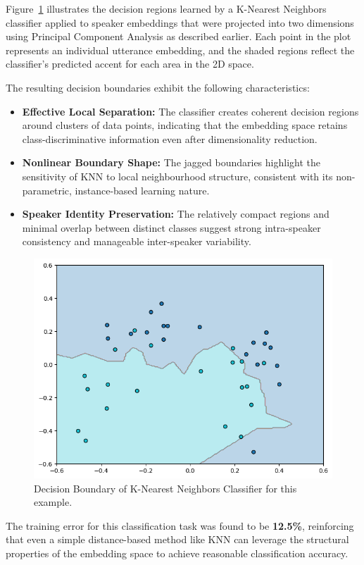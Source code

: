 \documentclass[conference]{IEEEtran}
\begin{document}
	
	Figure~\ref{fig:knn-shl-ilo} illustrates the decision regions learned by a K-Nearest Neighbors classifier applied to speaker embeddings that were projected into two dimensions using Principal Component Analysis as described earlier. Each point in the plot represents an individual utterance embedding, and the shaded regions reflect the classifier's predicted accent for each area in the 2D space.
	
	The resulting decision boundaries exhibit the following characteristics:
	
	\begin{itemize}
		\item \textbf{Effective Local Separation:} The classifier creates coherent decision regions around clusters of data points, indicating that the embedding space retains class-discriminative information even after dimensionality reduction.
		\item \textbf{Nonlinear Boundary Shape:} The jagged boundaries highlight the sensitivity of KNN to local neighbourhood structure, consistent with its non-parametric, instance-based learning nature.
		\item \textbf{Speaker Identity Preservation:} The relatively compact regions and minimal overlap between distinct classes suggest strong intra-speaker consistency and manageable inter-speaker variability.
	\end{itemize}
	
	
	\begin{figure}[H]
		\centering
		\includegraphics[width=0.7\linewidth]{img/img-knn-shl-ilo.png}
		\caption{Decision Boundary of K-Nearest Neighbors Classifier for this example.}
		\label{fig:knn-shl-ilo}
	\end{figure}
	
	The training error for this classification task was found to be \textbf{12.5\%}, reinforcing that even a simple distance-based method like KNN can leverage the structural properties of the embedding space to achieve reasonable classification accuracy.
	
\end{document}
